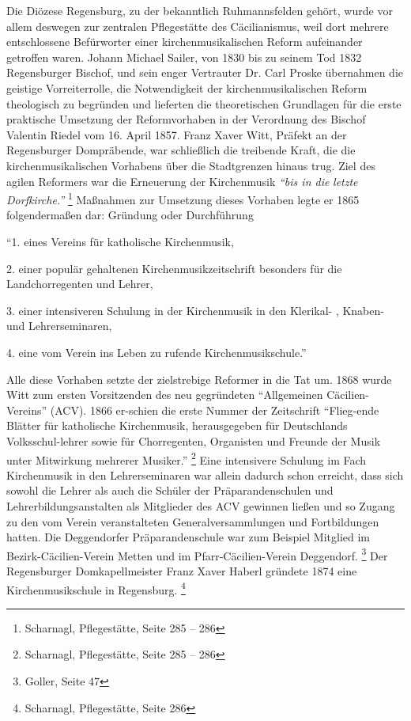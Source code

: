 \documentclass[a4paper]{article}
\newcommand\zitat[1]{\textit{#1}}
\begin{document}
Die Diözese Regensburg, zu der bekanntlich Ruhmannsfelden gehört, wurde
vor allem deswegen zur zentralen Pflegestätte des Cäcilianismus, weil
dort mehrere entschlossene Befürworter einer kirchenmusikalischen
Reform aufeinander getroffen waren. Johann Michael Sailer, von 1830 bis
zu seinem Tod 1832 Regensburger Bischof, und sein enger Vertrauter Dr.
Carl Proske übernahmen die geistige Vorreiterrolle, die Notwendigkeit
der kirchenmusikalischen Reform theologisch zu begründen und lieferten
die theoretischen Grundlagen für die erste praktische Umsetzung der
Reformvorhaben in der Verordnung des Bischof Valentin Riedel vom 16.
April 1857. Franz Xaver Witt, Präfekt an der Regensburger Dompräbende,
war schließlich die treibende Kraft, die die kirchenmusikalischen
Vorhabens über die Stadtgrenzen hinaus trug. Ziel des agilen Reformers
war die Erneuerung der Kirchenmusik \zitat{“bis in die
}\zitat{letzte Dorfkirche.” } \footnote{Scharnagl,
Pflegestätte, Seite 285 – 286} Maßnahmen zur Umsetzung dieses Vorhaben
legte er 1865 folgendermaßen dar: Gründung oder Durchführung

“1. eines Vereins für katholische Kirchenmusik,

2. einer populär gehaltenen Kirchenmusikzeitschrift besonders für die
Landchorregenten und Lehrer,

3. einer intensiveren Schulung in der Kirchenmusik in den Klerikal- ,
Knaben- und Lehrerseminaren,

4. eine vom Verein ins Leben zu rufende Kirchenmusikschule.”

Alle diese Vorhaben setzte der zielstrebige Reformer in die Tat um. 1868
wurde Witt zum ersten Vorsitzenden des neu gegründeten “Allgemeinen
Cäcilien-Vereins” (ACV). 1866 er-schien die erste Nummer der
Zeitschrift “Flieg-ende Blätter für katholische Kirchenmusik,
herausgegeben für Deutschlands Volksschul-lehrer sowie für
Chorregenten, Organisten und Freunde der Musik unter Mitwirkung
mehrerer Musiker.” \footnote{Scharnagl, Pflegestätte, Seite 285 – 286}
Eine intensivere Schulung im Fach Kirchenmusik in den Lehrerseminaren
war allein dadurch schon erreicht, dass sich sowohl die Lehrer als auch
die Schüler der Präparandenschulen und Lehrerbildungsanstalten als
Mitglieder des ACV gewinnen ließen und so Zugang zu den vom Verein
veranstalteten Generalversammlungen und Fortbildungen hatten. Die
Deggendorfer Präparandenschule war zum Beispiel Mitglied im
Bezirk-Cäcilien-Verein Metten und im Pfarr-Cäcilien-Verein
Deggendorf. \footnote{Goller, Seite 47} Der Regensburger
Domkapellmeister Franz Xaver Haberl gründete 1874 eine
Kirchenmusikschule in Regensburg. \footnote{Scharnagl, Pflegestätte,
Seite 286}
\end{document}
